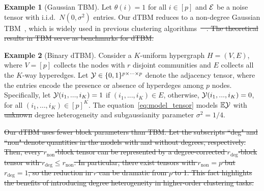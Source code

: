 \documentclass[twoside]{article}
\theoremstyle{definition}
\theoremstyle{definition}
\newtheorem{example}{Example}
\newtheorem{rmk}{Remark}
\providecommand{\DIFaddtex}[1]{{\protect\color{blue}\uwave{#1}}} %
\providecommand{\DIFdeltex}[1]{{\protect\color{red}\sout{#1}}}                      %
\providecommand{\DIFaddbegin}{} %
\providecommand{\DIFaddend}{} %
\providecommand{\DIFdelbegin}{} %
\providecommand{\DIFdelend}{} %
\providecommand{\DIFadd}[1]{\texorpdfstring{\DIFaddtex{#1}}{#1}} %
\providecommand{\DIFdel}[1]{\texorpdfstring{\DIFdeltex{#1}}{}} %
\newcommand{\DIFscaledelfig}{0.5}
\newlength{\DIFdelgraphicswidth} %
\newlength{\DIFdelgraphicsheight} %
\newcommand{\DIFaddincludegraphics}[2][]{{\color{blue}\fbox{\DIFOincludegraphics[#1]{#2}}}} %
\newcommand{\DIFdelincludegraphics}[2][]{%
\sbox{\DIFdelgraphicsbox}{\DIFOincludegraphics[#1]{#2}}%
\settoboxwidth{\DIFdelgraphicswidth}{\DIFdelgraphicsbox} %
\settoboxtotalheight{\DIFdelgraphicsheight}{\DIFdelgraphicsbox} %
\scalebox{\DIFscaledelfig}{%
\parbox[b]{\DIFdelgraphicswidth}{\usebox{\DIFdelgraphicsbox}\\[-\baselineskip] \rule{\DIFdelgraphicswidth}{0em}}\llap{\resizebox{\DIFdelgraphicswidth}{\DIFdelgraphicsheight}{%
\setlength{\unitlength}{\DIFdelgraphicswidth}%
\begin{picture}(1,1)%
\thicklines\linethickness{2pt} %
{\color[rgb]{1,0,0}\put(0,0){\framebox(1,1){}}}%
{\color[rgb]{1,0,0}\put(0,0){\line( 1,1){1}}}%
{\color[rgb]{1,0,0}\put(0,1){\line(1,-1){1}}}%
\end{picture}%
}\hspace*{3pt}}} %
} %
\DeclareRobustCommand{\DIFaddbegin}{\DIFOaddbegin \let\includegraphics\DIFaddincludegraphics} %
\DeclareRobustCommand{\DIFaddend}{\DIFOaddend \let\includegraphics\DIFOincludegraphics} %
\DeclareRobustCommand{\DIFdelbegin}{\DIFOdelbegin \let\includegraphics\DIFdelincludegraphics} %
\DeclareRobustCommand{\DIFdelend}{\DIFOaddend \let\includegraphics\DIFOincludegraphics} %
\begin{document}
\DIFaddend \begin{example}[Gaussian TBM]
Let $\theta(i)= 1$ for all $i \in [p]$ and $\mathcal{E}$ be a noise tensor with i.i.d.\ $N(0,\sigma^2)$ entries. Our dTBM reduces to a non-degree Gaussian TBM~\citep{wang2019multiway, han2020exact}, which is widely used in previous clustering algorithms~\DIFdelbegin \DIFdel{\mbox{%
\cite{wang2019multiway,chi2020provable}}\hspace{0pt}%
. 
The theoretical results in TBM serve as benchmarks for dTBM. 
}\DIFdelend \DIFaddbegin \DIFadd{\mbox{%
\citep{wang2019multiway,chi2020provable}}\hspace{0pt}%
. 
}\DIFaddend \end{example}

\begin{example}[Binary dTBM]
Consider a $K$-uniform hypergraph $H = (V,E)$, where $V = [p]$ collects the nodes with $r$ disjoint communities and $E$ collects all the $K$-way hyperedges. Let $\mathcal{Y} \in \{0,1\}^{p \times \cdots \times p}$ denote the adjacency tensor, where the entries encode the presence or absence of hyperdeges among $p$ nodes. Specifically, let $\mathcal{Y}(i_1,...,i_K) = 1$ if  $(i_1,...,i_K) \in E$, otherwise, $\mathcal{Y}(i_1,...,i_K) = 0$, for all $(i_1,\ldots,i_K) \in [p]^K$. The equation~\eqref{eq:model_tensor} models $\mathbb{E}\mathcal{Y}$ with \DIFdelbegin \DIFdel{unknown }\DIFdelend degree heterogeneity and subgaussianity parameter $\sigma^2 = 1/4$. 
\end{example}




\DIFdelbegin %
\DIFdel{Our dTBM uses fewer block parameters than TBM. Let the subscripts ``deg" and ``non" denote quantities in the models with and without degrees, respectively. Then, every $r_{\text{non}}$-block tensor can be represented by a degree-corrected $r_{\text{deg}}$-block tensor with $r_{\text{deg}}\leq r_{\text{non}}$. In particular, there exist tensors with $r_{\text{non}}=p$ but $r_{\text{deg}}=1$, so the reduction in $r$ can be dramatic from $p$ to 1. This fact highlights the benefits of introducing degree heterogeneity in higher-order clustering tasks.
}%
\DIFdelend %
\end{document}
